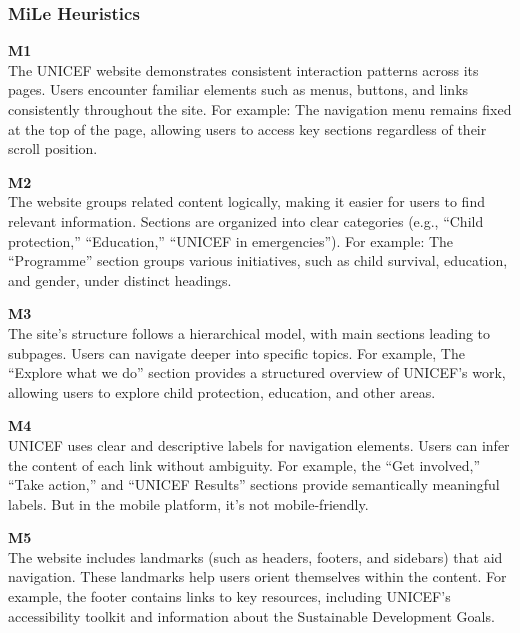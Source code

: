 \subsubsection{MiLe Heuristics}
\begin{description}
    \item {\textbf{M1} \color{unicefGray}{Consistency of interaction}}\\
    The UNICEF website demonstrates consistent interaction patterns across its pages. Users encounter familiar elements such as menus, buttons, and links consistently throughout the site. For example: The navigation menu remains fixed at the top of the page, allowing users to access key sections regardless of their scroll position.
    \item {\textbf{M2} \color{unicefGray}{Group navigation}}\\
    The website groups related content logically, making it easier for users to find relevant information. Sections are organized into clear categories (e.g., “Child protection,” “Education,” “UNICEF in emergencies”). For example: The “Programme” section groups various initiatives, such as child survival, education, and gender, under distinct headings.
    \item {\textbf{M3} \color{unicefGray}{Structural navigation}}\\
    The site’s structure follows a hierarchical model, with main sections leading to subpages. Users can navigate deeper into specific topics. For example, The “Explore what we do” section provides a structured overview of UNICEF’s work, allowing users to explore child protection, education, and other areas.
    \item {\textbf{M4} \color{unicefGray}{Semantic navigation}}\\
    UNICEF uses clear and descriptive labels for navigation elements. Users can infer the content of each link without ambiguity. For example, the “Get involved,” “Take action,” and “UNICEF Results” sections provide semantically meaningful labels. But in the mobile platform, it's not mobile-friendly.
    \item {\textbf{M5} \color{unicefGray}{Presence of landmarks}}\\
    The website includes landmarks (such as headers, footers, and sidebars) that aid navigation. These landmarks help users orient themselves within the content. For example, the footer contains links to key resources, including UNICEF’s accessibility toolkit and information about the Sustainable Development Goals.
\end{description}
